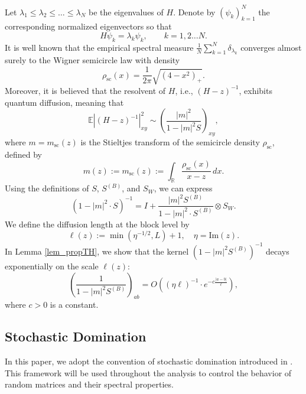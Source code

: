 \documentclass[10pt,reqno]{article}
\newcommand{\be}{\begin{equation}}
\newcommand{\ee}{\end{equation}}
\theoremstyle{plain} %
\theoremstyle{remark}
\numberwithin{equation}{section}
\begin{document}
Let \( \lambda_1 \leq \lambda_2 \leq \dots \leq \lambda_N \) be the eigenvalues of \( H \).  Denote by  \( \left( \psi_k \right)_{k=1}^N \)  the corresponding normalized eigenvectors  so that
\[
H \psi_k = \lambda_k \psi_k,\quad\quad  k=1,2\ldots N. 
\]
It is well known that the empirical spectral measure
$\frac{1}{N} \sum_{k=1}^N \delta_{\lambda_k}$
converges almost surely to the Wigner semicircle law with density
\[
\rho_{\mathrm{sc}}(x) = \frac{1}{2\pi} \sqrt{(4 - x^2)_+}.
\]
Moreover, it is believed that the resolvent of \( H \), i.e., \( (H - z)^{-1} \), exhibits quantum diffusion, meaning that
\[
\mathbb{E} \left| (H - z)^{-1} \right|_{xy}^2 \sim \left( \frac{|m|^2}{1 - |m|^2 S} \right)_{xy},
\]
where \( m = m_{\mathrm{sc}}(z) \) is the Stieltjes transform of the semicircle density \( \rho_{\mathrm{sc}} \), defined by
\[
m(z):=m_{\mathrm{sc}}(z) := \int_{\mathbb{R}} \frac{\rho_{\mathrm{sc}}(x)}{x - z} \, dx.
\]
Using the definitions of \( S \), \( S^{(B)} \), and \( S_W \), we can express 
\[
(1 - |m|^2 \cdot S)^{-1} = I + \frac{|m|^2 S^{(B)}}{1 - |m|^2 \cdot S^{(B)}} \otimes S_W.
\]
We define the diffusion length at the block level by
\be\label{def_ellz}
 \ell(z) := \min \left( \eta^{-1/2}, L \right) + 1, \quad \eta = \mathrm{Im}(z).
\ee
In Lemma \ref{lem_propTH}, we show that the kernel \( (1-|m|^2S^{(B)})^{-1} \) decays exponentially on the scale \( \ell(z) \):
\[
\left( \frac{1}{1 - |m|^2 S^{(B)}} \right)_{ab} = O \left( (\eta \ell)^{-1} \cdot e^{-c \frac{|a - b|}{\ell}} \right),
\]
where \( c >0\) is a constant.

\subsection*{Stochastic Domination}

In this paper, we adopt the convention of stochastic domination introduced in \cite{Average_fluc}. This framework will be used throughout the analysis to control the behavior of random matrices and their spectral properties.

 
\end{document}
